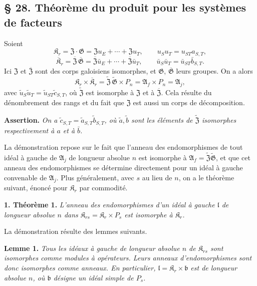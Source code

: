 \subsection*{\S{} 28. Théorème du produit pour les systèmes de facteurs}\label{fr-r823-theoreme-produit-systemes-facteurs}

Soient
\[
\mathfrak K_r=\mathfrak Z\cdot\mathfrak G
=\mathfrak Zu_E+\cdots+\mathfrak Zu_T,
\qquad u_Su_T=u_{ST}a_{S,T},
\]
\[
\overline{\mathfrak K}_r
=\overline{\mathfrak Z}\,\overline{\mathfrak G}
=\overline{\mathfrak Z}\bar u_E+\cdots+\overline{\mathfrak Z}\bar u_T,
\qquad
\bar u_S\bar u_T=\bar u_{ST}\bar b_{S,T}.
\]
Ici \(\mathfrak Z\) et \(\overline{\mathfrak Z}\) sont des corps galoisiens isomorphes, et \(\mathfrak G\), \(\overline{\mathfrak G}\) leurs groupes. On a alors
\[
\mathfrak K_r\times\overline{\mathfrak K}_r
=\widetilde{\mathfrak Z}\,\widetilde{\mathfrak G}\times P_n
=\mathfrak A_f\times P_n
=\mathfrak A_j,
\]
avec \(\tilde u_S\tilde u_T=\tilde u_{ST}\tilde c_{S,T}\), où \(\widetilde{\mathfrak Z}\) est isomorphe à \(\mathfrak Z\) et à \(\overline{\mathfrak Z}\). Cela résulte du dénombrement des rangs et du fait que \(\mathfrak Z\) est aussi un corps de décomposition.

\noindent\textbf{Assertion.} \emph{On a \(\tilde c_{S,T}=\tilde a_{S,T}\tilde b_{S,T}\), où \(\tilde a,\tilde b\) sont les éléments de \(\widetilde{\mathfrak Z}\) isomorphes respectivement à \(a\) et à \(\bar b\).}

La démonstration repose sur le fait que l'anneau des endomorphismes de tout idéal à gauche de \(\mathfrak A_j\) de longueur absolue \(n\) est isomorphe à \(\mathfrak A_f=\widetilde{\mathfrak Z}\widetilde{\mathfrak G}\), et que cet anneau des endomorphismes se détermine directement pour un idéal à gauche convenable de \(\mathfrak A_j\). Plus généralement, avec \(s\) au lieu de \(n\), on a le théorème suivant, énoncé pour \(\mathfrak K_r\) par commodité.

\noindent\textbf{1. Théorème 1.} \emph{L'anneau des endomorphismes d'un idéal à gauche \(\mathfrak l\) de longueur absolue \(n\) dans \(\mathfrak K_{rs}=\mathfrak K_r\times P_s\) est isomorphe à \(\mathfrak K_r\).}

La démonstration résulte des lemmes suivants.

\noindent\textbf{Lemme 1.} \emph{Tous les idéaux à gauche de longueur absolue \(n\) de \(\mathfrak K_{rs}\) sont isomorphes comme modules à opérateurs. Leurs anneaux d'endomorphismes sont donc isomorphes comme anneaux. En particulier, \(\mathfrak l=\mathfrak K_r\times\mathfrak b\) est de longueur absolue \(n\), où \(\mathfrak b\) désigne un idéal simple de \(P_s\).}

